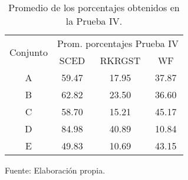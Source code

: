 \begin{table}[H]
\centering
\begin{tabular}{|c|ccc|}
\hline
\multirow{2}{*}{Conjunto} & \multicolumn{3}{c|}{Prom. porcentajes Prueba IV}    \\ \cline{2-4}
                          & \multicolumn{1}{c|}{SCED}  & \multicolumn{1}{c|}{RKRGST}   & WF \\ \hline
A                         & \multicolumn{1}{c|}{59.47} & \multicolumn{1}{c|}{17.95} & 37.87   \\ \hline
B                         & \multicolumn{1}{c|}{62.82} & \multicolumn{1}{c|}{23.50} & 36.60   \\ \hline
C                         & \multicolumn{1}{c|}{58.70} & \multicolumn{1}{c|}{15.21} & 45.17   \\ \hline
D                         & \multicolumn{1}{c|}{84.98} & \multicolumn{1}{c|}{40.89} & 10.84   \\ \hline
E                         & \multicolumn{1}{c|}{49.83} & \multicolumn{1}{c|}{10.69} & 43.15   \\ \hline
\end{tabular}
\caption{Promedio de los porcentajes obtenidos en la Prueba IV.}
Fuente: Elaboración propia.
\label{datosDemHip}
\end{table}
